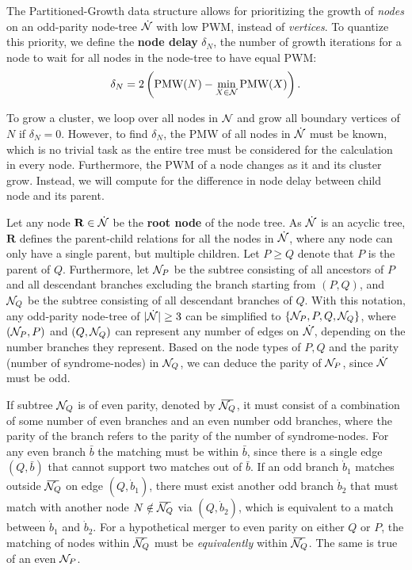 The Partitioned-Growth data structure allows for prioritizing the growth of \emph{nodes} on an odd-parity node-tree $\dot{\mathcal{N}}$ with low PWM, instead of \emph{vertices}. To quantize this priority, we define the \textbf{node delay} $\delta_N$, the number of growth iterations for a node to wait for all nodes in the node-tree to have equal PWM: 
\begin{equation}\label{eq:delayequation}
    \delta_N = 2\left(\text{PMW}(N) - \min_{X\in\mathcal{N}}{\text{PMW}(X)}\right).
\end{equation}

To grow a cluster, we loop over all nodes in $\mathcal{N}$ and grow all boundary vertices of $N$ if $\delta_N=0$. However, to find $\delta_N$, the PMW of all nodes in $\dot{\mathcal{N}}$ must be known, which is no trivial task as the entire tree must be considered for the calculation in every node. Furthermore, the PWM of a node changes as it and its cluster grow. Instead, we will compute for the difference in node delay between child node and its parent. 

Let any node $\mathbf{R}\in\dot{\mathcal{N}}$ be the \textbf{root node} of the node tree. As $\dot{\mathcal{N}}$ is an acyclic tree, $\mathbf{R}$ defines the parent-child relations for all the nodes in $\dot{\mathcal{N}}$, where any node can only have a single parent, but multiple children. Let $P\geq Q$ denote that $P$ is the parent of $Q$. Furthermore, let $\mathcal{N}_P$ be the subtree consisting of all ancestors of $P$ and all descendant branches excluding the branch starting from $(P,Q)$, and $\mathcal{N}_Q$ be the subtree consisting of all descendant branches of $Q$. With this notation, any odd-parity node-tree of $\lvert\dot{\mathcal{N}}\rvert\geq 3$ can be simplified to $\{\mathcal{N}_P,P,Q,\mathcal{N}_Q\}$, where $(\mathcal{N}_P, P)$ and $(Q, \mathcal{N}_Q)$ can represent any number of edges on $\dot{\mathcal{N}}$, depending on the number branches they represent. Based on the node types of $P,Q$ and the parity (number of syndrome-nodes) in $\mathcal{N}_Q$, we can deduce the parity of $\mathcal{N}_P$, since $\dot{\mathcal{N}}$ must be odd. 

If subtree $\mathcal{N}_Q$ is of even parity, denoted by $\overbar{\nset_Q}$, it must consist of a combination of some number of even branches and an even number odd branches, where the parity of the branch refers to the parity of the number of syndrome-nodes. For any even branch $\bar{b}$ the matching must be within $\bar{b}$, since there is a single edge $(Q,\bar{b})$ that cannot support two matches out of $\bar{b}$. If an odd branch $\dot{b}_1$ matches outside $\overbar{\nset_Q}$ on edge $(Q, \dot{b}_1)$, there must exist another odd branch $\dot{b}_2$ that must match with another node $N \notin \overbar{\nset_Q}$  via $(Q, \dot{b}_2)$, which is equivalent to a match between $\dot{b}_1$ and $\dot{b}_2$. For a hypothetical merger to even parity on either $Q$ or $P$, the matching of nodes within $\overbar{\nset_Q}$ must be \emph{equivalently} within $\overbar{\nset_Q}$. The same is true of an even $\mathcal{N}_P$.

